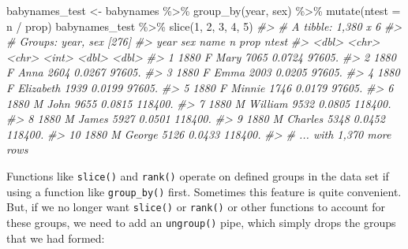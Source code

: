 \documentclass[
]{book}
\newenvironment{Shaded}{\begin{snugshade}}{\end{snugshade}}
\newcommand{\AttributeTok}[1]{\textcolor[rgb]{0.77,0.63,0.00}{#1}}
\newcommand{\CommentTok}[1]{\textcolor[rgb]{0.56,0.35,0.01}{\textit{#1}}}
\newcommand{\DecValTok}[1]{\textcolor[rgb]{0.00,0.00,0.81}{#1}}
\newcommand{\FunctionTok}[1]{\textcolor[rgb]{0.00,0.00,0.00}{#1}}
\newcommand{\NormalTok}[1]{#1}
\newcommand{\OtherTok}[1]{\textcolor[rgb]{0.56,0.35,0.01}{#1}}
\newcommand{\SpecialCharTok}[1]{\textcolor[rgb]{0.00,0.00,0.00}{#1}}
\begin{document}
\begin{Shaded}
\begin{Highlighting}[]
\NormalTok{babynames\_test }\OtherTok{\textless{}{-}}\NormalTok{ babynames }\SpecialCharTok{\%\textgreater{}\%}
  \FunctionTok{group\_by}\NormalTok{(year, sex) }\SpecialCharTok{\%\textgreater{}\%} \FunctionTok{mutate}\NormalTok{(}\AttributeTok{ntest =}\NormalTok{ n }\SpecialCharTok{/}\NormalTok{ prop)}
\NormalTok{babynames\_test }\SpecialCharTok{\%\textgreater{}\%} \FunctionTok{slice}\NormalTok{(}\DecValTok{1}\NormalTok{, }\DecValTok{2}\NormalTok{, }\DecValTok{3}\NormalTok{, }\DecValTok{4}\NormalTok{, }\DecValTok{5}\NormalTok{)}
\CommentTok{\#\textgreater{} \# A tibble: 1,380 x 6}
\CommentTok{\#\textgreater{} \# Groups:   year, sex [276]}
\CommentTok{\#\textgreater{}     year sex   name          n   prop   ntest}
\CommentTok{\#\textgreater{}    \textless{}dbl\textgreater{} \textless{}chr\textgreater{} \textless{}chr\textgreater{}     \textless{}int\textgreater{}  \textless{}dbl\textgreater{}   \textless{}dbl\textgreater{}}
\CommentTok{\#\textgreater{}  1  1880 F     Mary       7065 0.0724  97605.}
\CommentTok{\#\textgreater{}  2  1880 F     Anna       2604 0.0267  97605.}
\CommentTok{\#\textgreater{}  3  1880 F     Emma       2003 0.0205  97605.}
\CommentTok{\#\textgreater{}  4  1880 F     Elizabeth  1939 0.0199  97605.}
\CommentTok{\#\textgreater{}  5  1880 F     Minnie     1746 0.0179  97605.}
\CommentTok{\#\textgreater{}  6  1880 M     John       9655 0.0815 118400.}
\CommentTok{\#\textgreater{}  7  1880 M     William    9532 0.0805 118400.}
\CommentTok{\#\textgreater{}  8  1880 M     James      5927 0.0501 118400.}
\CommentTok{\#\textgreater{}  9  1880 M     Charles    5348 0.0452 118400.}
\CommentTok{\#\textgreater{} 10  1880 M     George     5126 0.0433 118400.}
\CommentTok{\#\textgreater{} \# ... with 1,370 more rows}
\end{Highlighting}
\end{Shaded}

Functions like \texttt{slice()} and \texttt{rank()} operate on defined groups in the data set if using a function like \texttt{group\_by()} first. Sometimes this feature is quite convenient. But, if we no longer want \texttt{slice()} or \texttt{rank()} or other functions to account for these groups, we need to add an \texttt{ungroup()} pipe, which simply drops the groups that we had formed:
\end{document}
